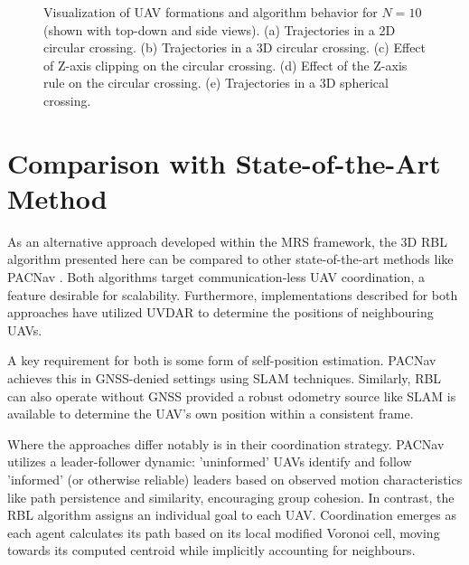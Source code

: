 \begin{figure}[H]
{                \label{fig:n_10_circle_z_rule}
            }
            \par\medskip
            \caption{
                Visualization of UAV formations and algorithm behavior for $N=10$ (shown with top-down and side views). 
                (a) Trajectories in a \ac{2D} circular crossing. 
                (b) Trajectories in a \ac{3D} circular crossing. 
                (c) Effect of Z-axis clipping on the circular crossing. 
                (d) Effect of the Z-axis rule on the circular crossing. 
                (e) Trajectories in a \ac{3D} spherical crossing.
            }
            \label{fig:trajectories}
        \end{figure}

    \section{Comparison with State-of-the-Art Method}
        As an alternative approach developed within the MRS framework, the \ac{3D} \ac{RBL} algorithm presented here can be compared to other state-of-the-art methods like PACNav \cite{PACNav}.
        Both algorithms target communication-less UAV coordination, a feature desirable for scalability. 
        Furthermore, implementations described for both approaches have utilized UVDAR to determine the positions of neighbouring UAVs.

        A key requirement for both is some form of self-position estimation. 
        PACNav achieves this in GNSS-denied settings using SLAM techniques. 
        Similarly, \ac{RBL} can also operate without GNSS provided a robust odometry source like SLAM is available to determine the UAV's own position within a consistent frame.

        Where the approaches differ notably is in their coordination strategy. 
        PACNav utilizes a leader-follower dynamic: 'uninformed' UAVs identify and follow 'informed' (or otherwise reliable) leaders based on observed motion characteristics like path persistence and similarity, encouraging group cohesion. 
        In contrast, the RBL algorithm assigns an individual goal to each UAV. 
        Coordination emerges as each agent calculates its path based on its local modified Voronoi cell, moving towards its computed centroid while implicitly accounting for neighbours.

